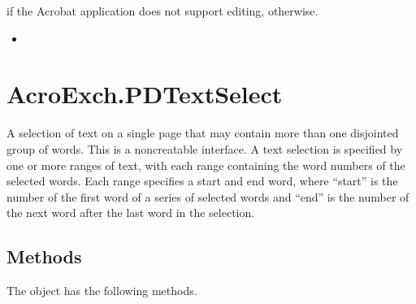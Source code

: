 \documentclass[letterpaper,12pt,english,openany,oneside]{sphinxmanual}
\begin{document}

 if the Acrobat application does not support editing,  otherwise.

\label{\detokenize{IAC_API_OLE_Objects:related-methods-128}}
\begin{itemize}
\item {} 
 

\end{itemize}




\section{AcroExch.PDTextSelect}
\label{\detokenize{IAC_API_OLE_Objects:acroexch-pdtextselect}}
A selection of text on a single page that may contain more than one disjointed group of words. This is a non\sphinxhyphen{}creatable interface. A text selection is specified by one or more ranges of text, with each range containing the word numbers of the selected words. Each range specifies a start and end word, where “start” is the number of the first word of a series of selected words and “end” is the number of the next word after the last word in the selection.


\subsection{Methods}
\label{\detokenize{IAC_API_OLE_Objects:methods-7}}\label{\detokenize{IAC_API_OLE_Objects:id21}}
The  object has the following methods.
\end{document}

